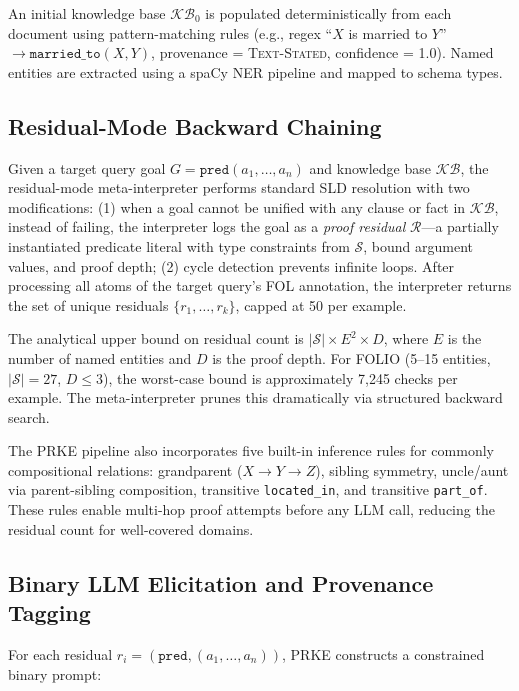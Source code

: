 \documentclass[11pt,letterpaper]{article}
\begin{document}
An initial knowledge base $\mathcal{KB}_0$ is populated deterministically from each document using pattern-matching rules (e.g., regex ``$X$ is married to $Y$'' $\rightarrow \mathtt{married\_to}(X,Y)$, provenance = \textsc{Text-Stated}, confidence = 1.0). Named entities are extracted using a spaCy NER pipeline and mapped to schema types.

\subsection{Residual-Mode Backward Chaining}
\label{sec:residual}

Given a target query goal $G = \mathtt{pred}(a_1, \ldots, a_n)$ and knowledge base $\mathcal{KB}$, the residual-mode meta-interpreter performs standard SLD resolution with two modifications: (1) when a goal cannot be unified with any clause or fact in $\mathcal{KB}$, instead of failing, the interpreter logs the goal as a \emph{proof residual} $\mathcal{R}$---a partially instantiated predicate literal with type constraints from $\mathcal{S}$, bound argument values, and proof depth; (2) cycle detection prevents infinite loops. After processing all atoms of the target query's FOL annotation, the interpreter returns the set of unique residuals $\{r_1, \ldots, r_k\}$, capped at 50 per example.

The analytical upper bound on residual count is $|\mathcal{S}| \times E^2 \times D$, where $E$ is the number of named entities and $D$ is the proof depth. For FOLIO (5--15 entities, $|\mathcal{S}|=27$, $D \leq 3$), the worst-case bound is approximately 7,245 checks per example. The meta-interpreter prunes this dramatically via structured backward search.

The PRKE pipeline also incorporates five built-in inference rules for commonly compositional relations: grandparent ($X \rightarrow Y \rightarrow Z$), sibling symmetry, uncle/aunt via parent-sibling composition, transitive \texttt{located\_in}, and transitive \texttt{part\_of}. These rules enable multi-hop proof attempts before any LLM call, reducing the residual count for well-covered domains.

\subsection{Binary LLM Elicitation and Provenance Tagging}

For each residual $r_i = (\mathtt{pred}, (a_1, \ldots, a_n))$, PRKE constructs a constrained binary prompt:
\end{document}
